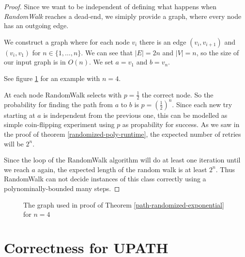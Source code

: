 \begin{proof}
Since we want to be independent of defining what happens when {\em RandomWalk} reaches a dead-end,
we simiply provide a graph, where every node has an outgoing edge.

We construct a graph where for each node $v_i$ there is an edge $(v_i, v_{i+1})$ and $(v_i, v_1)$ for $n \in \{ 1, \dots, n \}$.
We can see that $|E| = 2n$ and $|V| = n$, so the size of our input graph is in $O(n)$. We set $a = v_1$ and $b = v_n$.

See figure \ref{graph-randomized} for an example with $n=4$.

At each node RandomWalk selects with $p = \frac{1}{2}$ the correct node. So the probability for finding the path
from $a$ to $b$ is $p = \left(\frac{1}{2}\right)^n$. Since each new try starting at $a$ is independent from the previous
one, this can be modelled as simple coin-flipping experiment using $p$ as propability for success.
As we saw in the proof of theorem \ref{randomized-poly-runtime}, the expected number of retries will be $2^n$.

Since the loop of the RandomWalk algorithm will do at least one iteration until
we reach $a$ again, the expected length of the random walk is at least $2^n$.
Thus RandomWalk can not decide instances of this class correctly using a polynominally-bounded many steps.
\end{proof}

\begin{figure}
\caption{The graph used in proof of Theorem \ref{path-randomized-exponential} for $n=4$}
\label{graph-randomized}
\end{figure}

\section{Correctness for UPATH}\label{correctness-for-upath}

